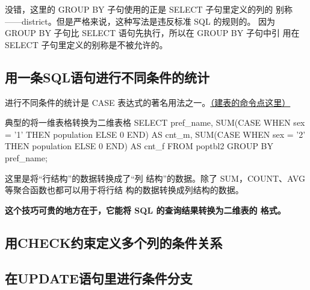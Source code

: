 没错，这里的 GROUP BY 子句使用的正是 SELECT 子句里定义的列的
别称——district。但是严格来说，这种写法是违反标准 SQL 的规则的。
因为 GROUP BY 子句比 SELECT 语句先执行，所以在 GROUP BY 子句中引
用在 SELECT 子句里定义的别称是不被允许的。

\subsection{用一条SQL语句进行不同条件的统计}
进行不同条件的统计是 CASE 表达式的著名用法之一。\href{https://github.com/JPL-JUNO/SQL/blob/main/ASQLP/PopTbl2.sql}{（建表的命令点这里）}
\begin{sql}{典型的将一维表格转换为二维表格}
SELECT
    pref_name,
    SUM(CASE WHEN sex = '1' THEN population ELSE 0 END) AS cnt_m,
    SUM(CASE WHEN sex = '2' THEN population ELSE 0 END) AS cnt_f
FROM poptbl2
GROUP BY pref_name;
\end{sql}

这里是将“行结构”的数据转换成了“列
结构”的数据。除了 SUM，COUNT、AVG 等聚合函数也都可以用于将行结
构的数据转换成列结构的数据。

\textbf{这个技巧可贵的地方在于，它能将 SQL 的查询结果转换为二维表的
格式。}
\subsection{用CHECK约束定义多个列的条件关系}
\subsection{在UPDATE语句里进行条件分支}






